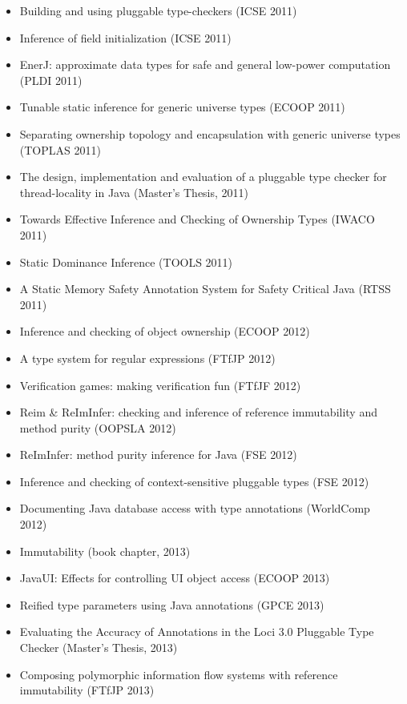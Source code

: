 \begin{itemize}
\item
  Building and using pluggable type-checkers (ICSE 2011)~\cite{DietlDEMS2011}
\item
  Inference of field initialization (ICSE 2011)~\cite{SpotoE2011}
\item
  EnerJ: approximate data types for safe and general low-power computation
  (PLDI 2011)~\cite{SampsonDFGCG2011}
\item
  Tunable static inference for generic universe types (ECOOP 2011)~\cite{DietlEM2011}
\item
  Separating ownership topology and encapsulation with generic universe
  types (TOPLAS 2011)~\cite{DietlDM2011}
\item
  The design, implementation and evaluation of a pluggable type checker for
  thread-locality in Java (Master's Thesis, 2011)~\cite{Sherwany2011}
\item
  Towards Effective Inference and Checking of Ownership Types (IWACO 2011)~\cite{HuangM2011}
\item
  Static Dominance Inference (TOOLS 2011)~\cite{MilanovaV2011}
\item
  A Static Memory Safety Annotation System for Safety Critical Java (RTSS 2011)~\cite{TangPNV2011}

\item
  Inference and checking of object ownership (ECOOP 2012)~\cite{HuangDME2012}
\item
  A type system for regular expressions (FTfJP 2012)~\cite{SpishakDE2012}
\item
  Verification games: making verification fun (FTfJF 2012)~\cite{DietlDEMWCPP2012}
\item
  Reim \& ReImInfer: checking and inference of reference immutability and
  method purity (OOPSLA 2012)~\cite{HuangMDE2012}
\item
  ReImInfer: method purity inference for Java (FSE 2012)~\cite{HuangM2012}
\item
  Inference and checking of context-sensitive pluggable types (FSE 2012)~\cite{MilanovaH2012}
\item
  Documenting Java database access with type annotations (WorldComp 2012)~\cite{Bergstein2012}

\item
  Immutability (book chapter, 2013)~\cite{PotaninOZE2013}
\item
  JavaUI: Effects for controlling UI object access (ECOOP 2013)~\cite{GordonDEG2013}
\item
  Reified type parameters using Java annotations (GPCE 2013)~\cite{GerakiosBS2013}
\item
  Evaluating the Accuracy of Annotations in the Loci 3.0 Pluggable Type
  Checker (Master's Thesis, 2013)~\cite{Zaza2013}
\item
  Composing polymorphic information flow systems with reference
  immutability (FTfJP 2013)~\cite{MilanovaH2013}



\end{itemize}
